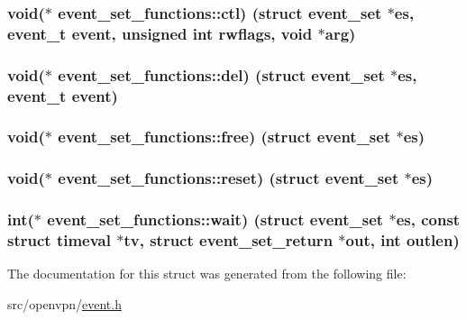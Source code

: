\subsubsection[{ctl}]{\setlength{\rightskip}{0pt plus 5cm}void($\ast$ event\+\_\+set\+\_\+functions\+::ctl) (struct {\bf event\+\_\+set} $\ast$es, {\bf event\+\_\+t} event, unsigned int rwflags, void $\ast$arg)}\label{structevent__set__functions_a04026a627e687ab44459660bb5b6cfe3}
\hypertarget{structevent__set__functions_a61638eee91067e2ba2c430cd35d87b07}{}
\subsubsection[{del}]{\setlength{\rightskip}{0pt plus 5cm}void($\ast$ event\+\_\+set\+\_\+functions\+::del) (struct {\bf event\+\_\+set} $\ast$es, {\bf event\+\_\+t} event)}\label{structevent__set__functions_a61638eee91067e2ba2c430cd35d87b07}
\hypertarget{structevent__set__functions_aabdea66ca4428093a3579a04832c01e0}{}
\subsubsection[{free}]{\setlength{\rightskip}{0pt plus 5cm}void($\ast$ event\+\_\+set\+\_\+functions\+::free) (struct {\bf event\+\_\+set} $\ast$es)}\label{structevent__set__functions_aabdea66ca4428093a3579a04832c01e0}
\hypertarget{structevent__set__functions_a88cad482b04e6f35f14be50c013ac0c4}{}
\subsubsection[{reset}]{\setlength{\rightskip}{0pt plus 5cm}void($\ast$ event\+\_\+set\+\_\+functions\+::reset) (struct {\bf event\+\_\+set} $\ast$es)}\label{structevent__set__functions_a88cad482b04e6f35f14be50c013ac0c4}
\hypertarget{structevent__set__functions_a348519d9f5634edcee292133e8544d4b}{}
\subsubsection[{wait}]{\setlength{\rightskip}{0pt plus 5cm}int($\ast$ event\+\_\+set\+\_\+functions\+::wait) (struct {\bf event\+\_\+set} $\ast$es, const struct timeval $\ast$tv, struct {\bf event\+\_\+set\+\_\+return} $\ast$out, int outlen)}\label{structevent__set__functions_a348519d9f5634edcee292133e8544d4b}


The documentation for this struct was generated from the following file\+:\begin{DoxyCompactItemize}
\item 
src/openvpn/\hyperlink{event_8h}{event.\+h}\end{DoxyCompactItemize}
